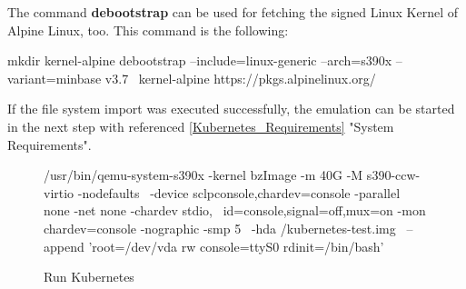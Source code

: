 The command \textbf{debootstrap} can be used for fetching the signed Linux Kernel of Alpine Linux, too.
This command is the following: \\
\begin{boxedverbatim}
mkdir kernel-alpine
debootstrap --include=linux-generic --arch=s390x --variant=minbase v3.7 \
kernel-alpine https://pkgs.alpinelinux.org/ 
\end{boxedverbatim}

If the file system import was executed successfully, the emulation can be started in the next step with referenced \ref{Kubernetes_Requirements} "System Requirements".

\begin{figure}[H]
\centering
\begin{boxedverbatim}
 /usr/bin/qemu-system-s390x -kernel bzImage -m 40G -M s390-ccw-virtio -nodefaults \
 -device sclpconsole,chardev=console -parallel none -net none -chardev stdio, \
 id=console,signal=off,mux=on -mon chardev=console -nographic -smp 5 \
 -hda /kubernetes-test.img \
 --append 'root=/dev/vda rw console=ttyS0 rdinit=/bin/bash' 
\end{boxedverbatim}
 \caption{Run Kubernetes}
    \label{RunKubernetes}
\end{figure}
